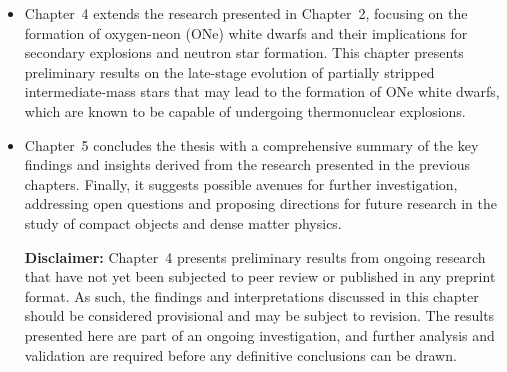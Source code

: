 \documentclass[main.tex]{subfiles}
\begin{document}
\begin{itemize}
        \item Chapter~4 extends the research presented in Chapter~2, focusing on the formation of oxygen-neon (ONe) white dwarfs and their implications for secondary explosions and neutron star formation. This chapter presents preliminary results on the late-stage evolution of partially stripped intermediate-mass stars that may lead to the formation of ONe white dwarfs, which are known to be capable of undergoing thermonuclear explosions.

        \item Chapter~5 concludes the thesis with a comprehensive summary of the key findings and insights derived from the research presented in the previous chapters. Finally, it suggests possible avenues for further investigation, addressing open questions and proposing directions for future research in the study of compact objects and dense matter physics.

        \vspace{2cm}

        \textbf{Disclaimer:} Chapter~4 presents preliminary results from ongoing research that have not yet been subjected to peer review or published in any preprint format. As such, the findings and interpretations discussed in this chapter should be considered provisional and may be subject to revision. The results presented here are part of an ongoing investigation, and further analysis and validation are required before any definitive conclusions can be drawn.
    \end{itemize}
    
\end{document}
